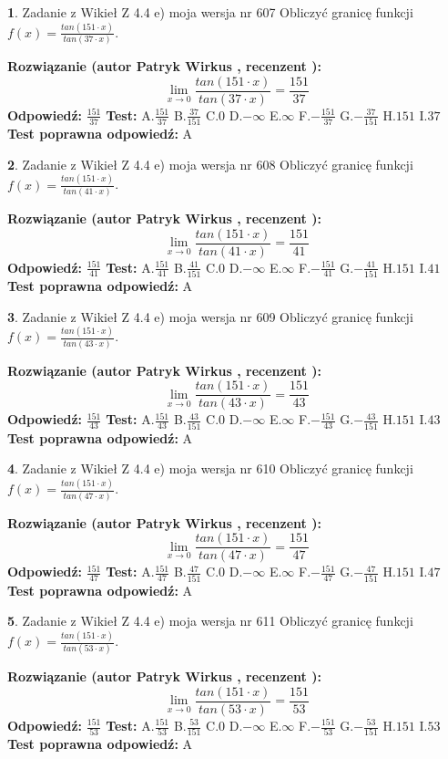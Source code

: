 \documentclass[12pt, a4paper]{article}
\theoremstyle{definition} %
\newtheorem{zad}{}
\newcommand{\zadStart}[1]{\begin{zad}#1\newline}
\newcommand{\zadStop}{\end{zad}}
\newcommand{\rozwStart}[2]{\noindent \textbf{Rozwiązanie (autor #1 , recenzent #2): }\newline}
\newcommand{\rozwStop}{\newline}
\newcommand{\odpStart}{\noindent \textbf{Odpowiedź:}\newline}
\newcommand{\odpStop}{\newline}
\newcommand{\testStart}{\noindent \textbf{Test:}\newline}
\newcommand{\testStop}{\newline}
\newcommand{\kluczStart}{\noindent \textbf{Test poprawna odpowiedź:}\newline}
\newcommand{\kluczStop}{\newline}
\begin{document}
\zadStart{Zadanie z Wikieł Z 4.4 e) moja wersja nr 607}
Obliczyć granicę funkcji $f(x)=\frac{tan(151\cdot x)}{tan(37\cdot x)}$.
\zadStop
\rozwStart{Patryk Wirkus}{}
$$\lim\limits_{x\to 0}\frac{tan(151\cdot x)}{tan(37\cdot x)}=
\frac{151}{37}$$
\rozwStop
\odpStart
$\frac{151}{37}$
\odpStop
\testStart
A.$\frac{151}{37}$
B.$\frac{37}{151}$
C.$0$
D.$-\infty$
E.$\infty$
F.$-\frac{151}{37}$
G.$-\frac{37}{151}$
H.$151$
I.$37$
\testStop
\kluczStart
A
\kluczStop



\zadStart{Zadanie z Wikieł Z 4.4 e) moja wersja nr 608}
Obliczyć granicę funkcji $f(x)=\frac{tan(151\cdot x)}{tan(41\cdot x)}$.
\zadStop
\rozwStart{Patryk Wirkus}{}
$$\lim\limits_{x\to 0}\frac{tan(151\cdot x)}{tan(41\cdot x)}=
\frac{151}{41}$$
\rozwStop
\odpStart
$\frac{151}{41}$
\odpStop
\testStart
A.$\frac{151}{41}$
B.$\frac{41}{151}$
C.$0$
D.$-\infty$
E.$\infty$
F.$-\frac{151}{41}$
G.$-\frac{41}{151}$
H.$151$
I.$41$
\testStop
\kluczStart
A
\kluczStop



\zadStart{Zadanie z Wikieł Z 4.4 e) moja wersja nr 609}
Obliczyć granicę funkcji $f(x)=\frac{tan(151\cdot x)}{tan(43\cdot x)}$.
\zadStop
\rozwStart{Patryk Wirkus}{}
$$\lim\limits_{x\to 0}\frac{tan(151\cdot x)}{tan(43\cdot x)}=
\frac{151}{43}$$
\rozwStop
\odpStart
$\frac{151}{43}$
\odpStop
\testStart
A.$\frac{151}{43}$
B.$\frac{43}{151}$
C.$0$
D.$-\infty$
E.$\infty$
F.$-\frac{151}{43}$
G.$-\frac{43}{151}$
H.$151$
I.$43$
\testStop
\kluczStart
A
\kluczStop



\zadStart{Zadanie z Wikieł Z 4.4 e) moja wersja nr 610}
Obliczyć granicę funkcji $f(x)=\frac{tan(151\cdot x)}{tan(47\cdot x)}$.
\zadStop
\rozwStart{Patryk Wirkus}{}
$$\lim\limits_{x\to 0}\frac{tan(151\cdot x)}{tan(47\cdot x)}=
\frac{151}{47}$$
\rozwStop
\odpStart
$\frac{151}{47}$
\odpStop
\testStart
A.$\frac{151}{47}$
B.$\frac{47}{151}$
C.$0$
D.$-\infty$
E.$\infty$
F.$-\frac{151}{47}$
G.$-\frac{47}{151}$
H.$151$
I.$47$
\testStop
\kluczStart
A
\kluczStop



\zadStart{Zadanie z Wikieł Z 4.4 e) moja wersja nr 611}
Obliczyć granicę funkcji $f(x)=\frac{tan(151\cdot x)}{tan(53\cdot x)}$.
\zadStop
\rozwStart{Patryk Wirkus}{}
$$\lim\limits_{x\to 0}\frac{tan(151\cdot x)}{tan(53\cdot x)}=
\frac{151}{53}$$
\rozwStop
\odpStart
$\frac{151}{53}$
\odpStop
\testStart
A.$\frac{151}{53}$
B.$\frac{53}{151}$
C.$0$
D.$-\infty$
E.$\infty$
F.$-\frac{151}{53}$
G.$-\frac{53}{151}$
H.$151$
I.$53$
\testStop
\kluczStart
A
\kluczStop
\end{document}
